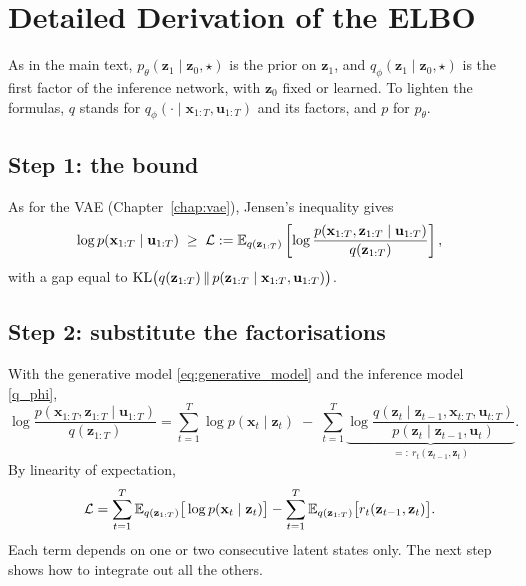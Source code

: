 \section{Detailed Derivation of the ELBO}\label{sec:elbo_derivation}

\begin{story}[Notation]
As in the main text, $p_{\theta}(\mathbf{z}_{1} \mid \mathbf{z}_{0},
\star)$ is the prior on $\mathbf{z}_1$, and $q_{\phi}(\mathbf{z}_{1}
\mid \mathbf{z}_{0}, \star)$ is the first factor of the inference
network, with $\mathbf{z}_0$ fixed or learned. To lighten the formulas,
$q$ stands for $q_\phi(\cdot \mid \mathbf{x}_{1:T}, \mathbf{u}_{1:T})$
and its factors, and $p$ for $p_\theta$.
\end{story}

\subsection*{Step 1: the bound}

As for the VAE (Chapter~\ref{chap:vae}), Jensen's inequality gives
\begin{equation*}
    \log p(\mathbf{x}_{1:T} \mid \mathbf{u}_{1:T}) \;\geq\;
    \mathcal{L} := \mathbb{E}_{q(\mathbf{z}_{1:T})}\left[\log
    \frac{p(\mathbf{x}_{1:T}, \mathbf{z}_{1:T} \mid \mathbf{u}_{1:T})}
    {q(\mathbf{z}_{1:T})}\right],
\end{equation*}
with a gap equal to $\mathrm{KL}\big(q(\mathbf{z}_{1:T}) \,\|\,
p(\mathbf{z}_{1:T} \mid \mathbf{x}_{1:T}, \mathbf{u}_{1:T})\big)$.

\subsection*{Step 2: substitute the factorisations}

With the generative model \eqref{eq:generative_model} and the inference
model \eqref{q_phi},
\begin{equation*}
    \log \frac{p(\mathbf{x}_{1:T}, \mathbf{z}_{1:T} \mid \mathbf{u}_{1:T})}
    {q(\mathbf{z}_{1:T})} =
    \sum_{t=1}^T \log p(\mathbf{x}_t \mid \mathbf{z}_t)
    \;-\; \sum_{t=1}^T \underbrace{\log \frac{q(\mathbf{z}_t \mid
    \mathbf{z}_{t-1}, \mathbf{x}_{t:T}, \mathbf{u}_{t:T})}
    {p(\mathbf{z}_t \mid \mathbf{z}_{t-1}, \mathbf{u}_t)}}_{=:\ r_t(
    \mathbf{z}_{t-1}, \mathbf{z}_t)}.
\end{equation*}
By linearity of expectation,
\begin{equation}
    \mathcal{L} = \sum_{t=1}^T \mathbb{E}_{q(\mathbf{z}_{1:T})}\big[\log
    p(\mathbf{x}_t \mid \mathbf{z}_t)\big] - \sum_{t=1}^T
    \mathbb{E}_{q(\mathbf{z}_{1:T})}\big[r_t(\mathbf{z}_{t-1}, \mathbf{z}_t)\big].
    \label{eq:elbo_step2}
\end{equation}
Each term depends on one or two consecutive latent states only. The next
step shows how to integrate out all the others.

